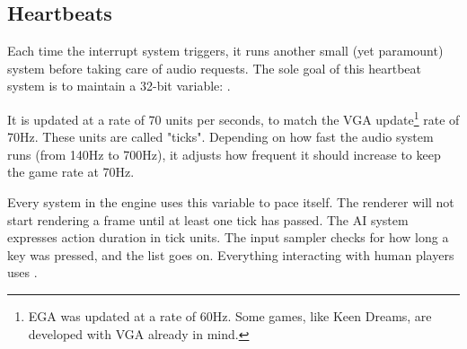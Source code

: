 \documentclass[book.tex]{subfiles}
\begin{document}
\subsection{Heartbeats}
Each time the interrupt system triggers, it runs another small (yet paramount) system before taking care of audio requests. The sole goal of this heartbeat system is to maintain a 32-bit variable: .\\
\par
\begin{minipage}{\textwidth}

\end{minipage}
\par
It is updated at a rate of 70 units per seconds, to match the VGA update\footnote{EGA was updated at a rate of 60Hz. Some games, like Keen Dreams, are developed with VGA already in mind.} rate of 70Hz. These units are called "ticks". Depending on how fast the audio system runs (from 140Hz to 700Hz), it adjusts how frequent it should increase  to keep the game rate at 70Hz.\\
\par
Every system in the engine uses this variable to pace itself. The renderer will not start rendering a frame until at least one tick has passed. The AI system expresses action duration in tick units. The input sampler checks for how long a key was pressed, and the list goes on. Everything interacting with human players uses .\\
\end{document}
